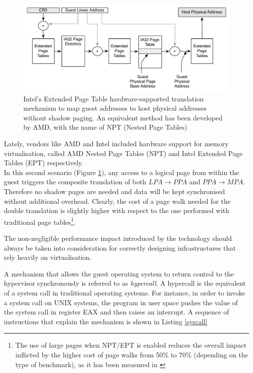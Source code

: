 \begin{figure}[htbp] 
\begin{center}
\includegraphics[scale=0.6]{images/EPT.pdf}
\caption{{Intel's Extended Page Table hardware-supported translation mechanism to map guest addresses to host physical addresses without shadow paging. An equivalent method has been developed by AMD, with the name of NPT (Nested Page Tables)}}
\label{EPT}
\end{center}
\end{figure}


Lately, vendors like AMD and Intel included hardware support for memory virtualisation, called AMD Nested Page Tables (NPT) and Intel Extended Page Tables (EPT)  respectively.\\ %
In this second scenario (Figure \ref{EPT}), any access to a logical page from within the guest triggers the composite translation of both $LPA \rightarrow PPA$ and $PPA \rightarrow MPA$. Therefore no shadow pages are needed and data will be kept synchronised without additional overhead. Clearly, the cost of a page walk needed for the double translation is slightly higher with respect to the one performed with traditional page tables\footnote{The use of large pages when NPT/EPT is enabled reduces the overall impact inflicted by the higher cost of page walks from 50\% to 70\% (depending on the type of benchmark), as it has been measured in \cite{perfEPT, perfESX} }.  


The non-negligible performance impact introduced by the technology should always be taken into consideration for correctly designing infrastructures that rely heavily on virtualisation.%

A mechanism that allows the guest operating system to return control to the hypervisor synchronously is referred to as \emph{hypercall}. A hypercall is the equivalent of a system call in traditional operating systems. 
For instance, in order to invoke a system call on UNIX systems, the program in user space pushes the value of the system call in register EAX and then raises an interrupt. A sequence of instructions that explain the mechanism is shown in Listing \ref{syscall}

